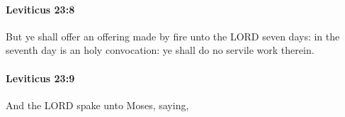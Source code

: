 		\paragraph{Leviticus 23:8} %
			\label{LEVITICUS-23-8}

			But ye shall offer an offering made by fire unto the LORD seven days: in the seventh day is an holy convocation: ye shall do no servile work therein.


		\paragraph{Leviticus 23:9} %
			\label{LEVITICUS-23-9}

			And the LORD spake unto Moses, saying,


